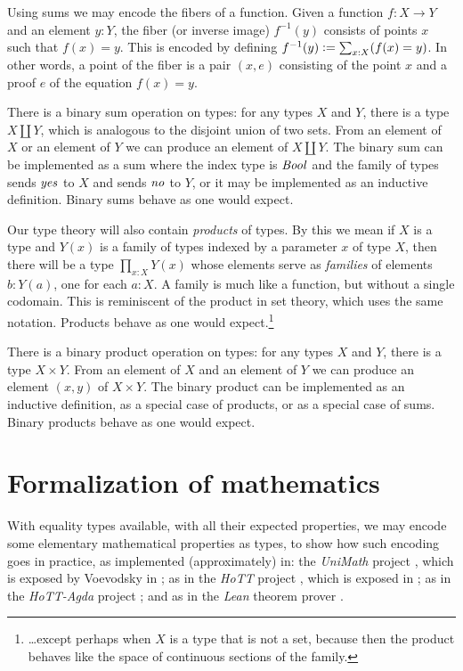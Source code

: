 \documentclass[letter,12pt]{amsart}
\theoremstyle{definition}
\theoremstyle{remark}
\numberwithin{equation}{section}
\newcommand{\bool}{\mathop{{\it Bool}}}
\newcommand{\yes}{\mathop{{\it yes}}}
\newcommand{\no}{\mathop{{\it no}}}
\newcommand{\defeq}{\vcentcolon=}
\begin{document}
Using sums we may encode the fibers of a function.  Given a function $f : X \to Y$ and an element $y:Y$, the fiber (or inverse image) $f^{-1}(y)$ consists of
points $x$ such that $f(x) = y$.  This is encoded by defining $f^{-1}(y) \defeq \sum_{x:X} (f(x) = y)$.  In other words, a point of the fiber is a
pair $(x,e)$ consisting of the point $x$ and a proof $e$ of the equation $f(x) = y$.

There is a binary sum operation on types: for any types $X$ and $Y$, there is a type $X \amalg Y$, which is analogous to the disjoint union of
two sets.  From an element of $X$ or an element of $Y$ we can produce an element of $X \amalg Y$.  The binary sum can be implemented as a sum
where the index type is $\bool$ and the family of types sends $\yes$ to $X$ and sends $\no$ to $Y$, or it may be implemented as an inductive
definition.  Binary sums behave as one would expect.

Our type theory will also contain {\em products} of types.  By this we mean if $X$ is a type and $Y(x)$ is a family of types indexed by a
parameter $x$ of type $X$, then there will be a type $\prod _{x:X} Y(x)$ whose elements serve as {\em families} of elements $b:Y(a)$, one for each $a:X$.
A family is much like a function, but without a single codomain.  This is reminiscent of the product in set theory, which uses the same notation.
Products behave as one would expect.\footnote{\dots except perhaps when $X$ is a type that is not a set, because then the product behaves like
  the space of continuous sections of the family.}

There is a binary product operation on types: for any types $X$ and $Y$, there is a type $X \times Y$.  From an element of $X$ and an element of
$Y$ we can produce an element $(x,y)$ of $X \times Y$.  The binary product can be implemented as an inductive definition, as a special case of
products, or as a special case of sums.  Binary products behave as one would expect.

\section{Formalization of mathematics}\label{form}

With equality types available, with all their expected properties, we may encode some elementary mathematical properties as types, to show how such
encoding goes in practice, as implemented (approximately) in: the {\em UniMath} project \citep{UniMath}, which is exposed by Voevodsky
in \citep{UniMath2015}; as in the {\em HoTT} project \citep{HoTT}, which is exposed in \citep{1610.04591}; as in the {\em HoTT-Agda} project
\citep{HoTT-Agda}; and as in the {\em Lean} theorem prover \citep{Lean}.
\end{document}
